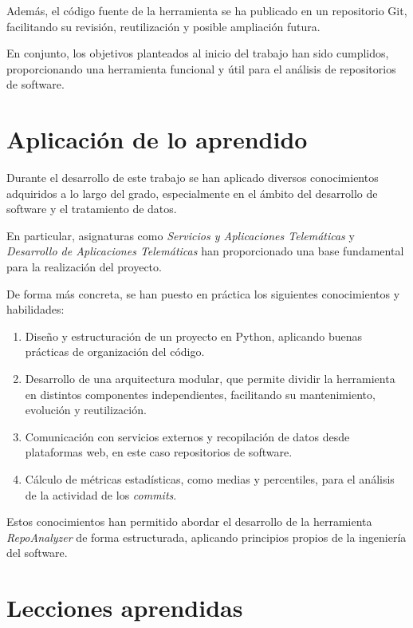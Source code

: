 \documentclass[a4paper, 12pt]{book}
\begin{document}
Además, el código fuente de la herramienta se ha publicado en un repositorio Git, facilitando su revisión, reutilización y posible ampliación futura.

En conjunto, los objetivos planteados al inicio del trabajo han sido cumplidos, proporcionando una herramienta funcional y útil para el análisis de repositorios de software.
\section{Aplicación de lo aprendido}
\label{sec:aplicacion}

Durante el desarrollo de este trabajo se han aplicado diversos conocimientos adquiridos a lo largo del grado, especialmente en el ámbito del desarrollo de software y el tratamiento de datos.

En particular, asignaturas como \emph{Servicios y Aplicaciones Telemáticas} y \emph{Desarrollo de Aplicaciones Telemáticas} han proporcionado una base fundamental para la realización del proyecto.

De forma más concreta, se han puesto en práctica los siguientes conocimientos y habilidades:

\begin{enumerate}
    \item Diseño y estructuración de un proyecto en Python, aplicando buenas prácticas de organización del código.
    
    \item Desarrollo de una arquitectura modular, que permite dividir la herramienta en distintos componentes independientes, facilitando su mantenimiento, evolución y reutilización.
    
    \item Comunicación con servicios externos y recopilación de datos desde plataformas web, en este caso repositorios de software.
    
    \item Cálculo de métricas estadísticas, como medias y percentiles, para el análisis de la actividad de los \emph{commits}.
\end{enumerate}

Estos conocimientos han permitido abordar el desarrollo de la herramienta \emph{RepoAnalyzer} de forma estructurada, aplicando principios propios de la ingeniería del software.
\section{Lecciones aprendidas}
\label{sec:lecciones_aprendidas}
\end{document}
